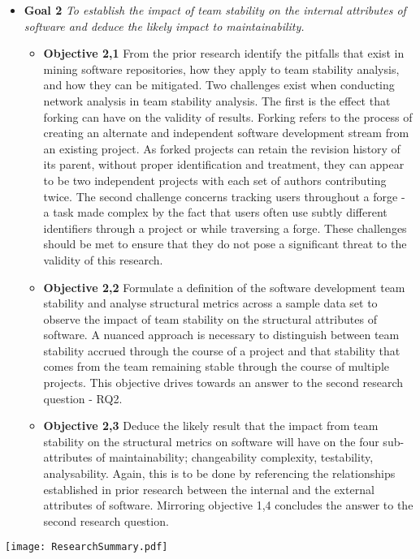 \begin{itemize}
\begin{itemize}
\end{itemize}
\item  \textbf{Goal 2} \textit{To establish the impact of team stability on the internal attributes of software and deduce the likely impact to maintainability.}
\begin{itemize}
\item \textbf{Objective 2,1} From the prior research identify the pitfalls that exist in mining software repositories, how they apply to team stability analysis, and how they can be mitigated. Two challenges exist when conducting network analysis in team stability analysis. The first is the effect that forking can have on the validity of results. Forking refers to the process of creating an alternate and independent software development stream from an existing project. As forked projects can retain the revision history of its parent, without proper identification and treatment, they can appear to be two independent projects with each set of authors contributing twice. The second challenge concerns tracking users throughout a forge - a task made complex by the fact that users often use subtly different identifiers through a project or while traversing a forge. These challenges should be met to ensure that they do not pose a significant threat to the validity of this research.
\item \textbf{Objective 2,2} Formulate a definition of the software development team stability and analyse structural metrics across a sample data set to observe the impact of team stability on the structural attributes of software. A nuanced approach is necessary to distinguish between team stability accrued through the course of a project and that stability that comes from the team remaining stable through the course of multiple projects. This objective drives towards an answer to the second research question - RQ2.
\item \textbf{Objective 2,3} Deduce the likely result that the impact from team stability on the structural metrics on software will have on the four sub-attributes of maintainability; changeability complexity, testability, analysability. Again, this is to be done by referencing the relationships established in prior research between the internal and the external attributes of software. Mirroring objective 1,4 concludes the answer to the second research question.
\end{itemize}
\end{itemize}

\begin{table}
\begin{tabular}
 \centering 
 \texttt{[image: ResearchSummary.pdf]}
 \label{tab:researchSummary}
\end{tabular}
\end{table}

